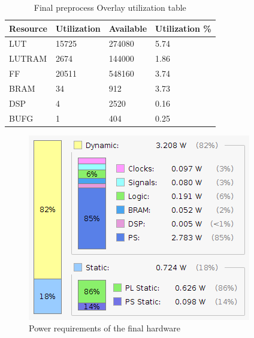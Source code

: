 
\begin{table}
\centering
\caption{Final preprocess Overlay utilization table}
\label{tab:preproc_final_usage}
\begin{tabular}{|l|l|l|l|}
\hline
Resource & Utilization & Available & Utilization \% \\ \hline
LUT & 15725 & 274080 & 5.74 \\ \hline
LUTRAM & 2674 & 144000 & 1.86 \\ \hline
FF & 20511 & 548160 & 3.74 \\ \hline
BRAM & 34 & 912 & 3.73 \\ \hline
DSP & 4 & 2520 & 0.16 \\ \hline
BUFG & 1 & 404 & 0.25 \\ \hline
\end{tabular}
\end{table}

\begin{figure}
    \centering
    \includegraphics{images/power_report.png}
    \caption{Power requirements of the final hardware}
    \label{fig:power}
\end{figure}

\clearpage

